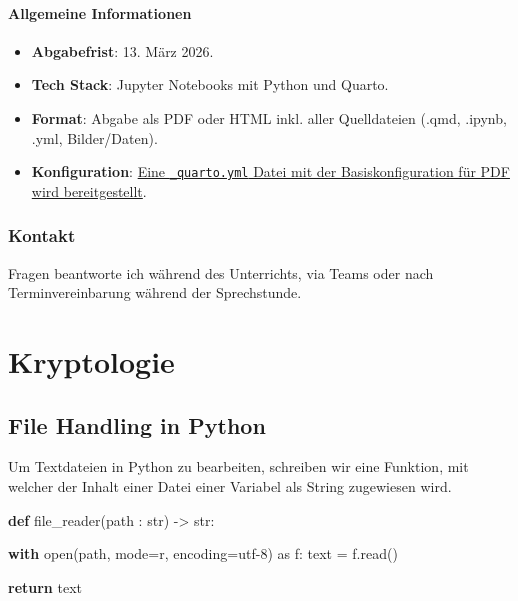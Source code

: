 \documentclass[
  nswissgerman,
  a4paper,
  DIV=11,
  numbers=noendperiod,
  ngerman]{scrreprt}
\newenvironment{Shaded}{\begin{snugshade}}{\end{snugshade}}
\newcommand{\BuiltInTok}[1]{\textcolor[rgb]{0.00,0.23,0.31}{#1}}
\newcommand{\ControlFlowTok}[1]{\textcolor[rgb]{0.00,0.23,0.31}{\textbf{#1}}}
\newcommand{\ImportTok}[1]{\textcolor[rgb]{0.00,0.46,0.62}{#1}}
\newcommand{\KeywordTok}[1]{\textcolor[rgb]{0.00,0.23,0.31}{\textbf{#1}}}
\newcommand{\NormalTok}[1]{\textcolor[rgb]{0.00,0.23,0.31}{#1}}
\newcommand{\OperatorTok}[1]{\textcolor[rgb]{0.37,0.37,0.37}{#1}}
\newcommand{\StringTok}[1]{\textcolor[rgb]{0.13,0.47,0.30}{#1}}
\providecommand{\tightlist}{%
  \setlength{\itemsep}{0pt}\setlength{\parskip}{0pt}}
\begin{document}
\subsection{Allgemeine Informationen}\label{allgemeine-informationen}

\begin{itemize}
\tightlist
\item
  \textbf{Abgabefrist}: 13. März 2026.
\item
  \textbf{Tech Stack}: Jupyter Notebooks mit Python und Quarto.
\item
  \textbf{Format}: Abgabe als PDF oder HTML inkl. aller Quelldateien
  (.qmd, .ipynb, .yml, Bilder/Daten).
\item
  \textbf{Konfiguration}: \href{quarto.yml}{Eine \texttt{\_quarto.yml}
  Datei mit der Basiskonfiguration für PDF wird bereitgestellt}.
\end{itemize}

\section{Kontakt}\label{kontakt}

Fragen beantworte ich während des Unterrichts, via Teams oder nach
Terminvereinbarung während der Sprechstunde.

\part{Kryptologie}

\chapter{File Handling in Python}\label{file-handling-in-python}

Um Textdateien in Python zu bearbeiten, schreiben wir eine Funktion, mit
welcher der Inhalt einer Datei einer Variabel als String zugewiesen
wird.

\begin{Shaded}
\begin{Highlighting}[numbers=left,,]
\KeywordTok{def}\NormalTok{ file\_reader(path : }\BuiltInTok{str}\NormalTok{) }\OperatorTok{{-}\textgreater{}} \BuiltInTok{str}\NormalTok{:}

    \ControlFlowTok{with} \BuiltInTok{open}\NormalTok{(path, mode}\OperatorTok{=}\StringTok{\textquotesingle{}r\textquotesingle{}}\NormalTok{, encoding}\OperatorTok{=}\StringTok{\textquotesingle{}utf{-}8\textquotesingle{}}\NormalTok{) }\ImportTok{as}\NormalTok{ f:}
\NormalTok{        text }\OperatorTok{=}\NormalTok{ f.read()}

    \ControlFlowTok{return}\NormalTok{ text}
\end{Highlighting}
\end{Shaded}
\end{document}
